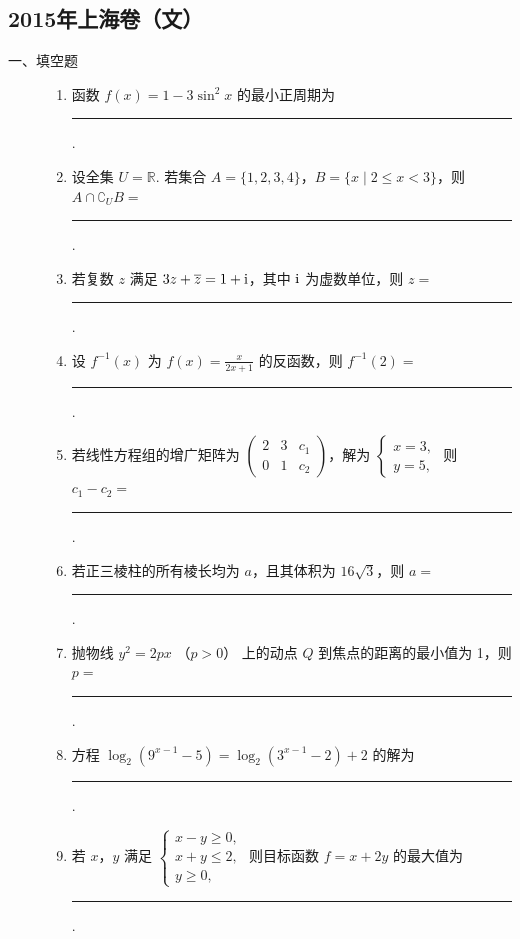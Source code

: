 \subsection{2015年上海卷（文）}\label{gk:2015年上海卷（文）}

\begin{description}

    \item[一、填空题]

    \begin{enumerate}[leftmargin=5pt]

        \item 函数 \( f(x)=1-3\sin^{2}x \) 的最小正周期为\rule[-0.3ex]{3em}{0.4pt}.

        \item 设全集 \(U = \mathbb{R}\). 若集合 \( A = \{1, 2, 3, 4\} \)，\( B = \{x \mid 2 \leqslant x < 3\} \)，则 \( A \cap \complement_U B = \)\rule[-0.3ex]{3em}{0.4pt}.

        \item 若复数 \(z\) 满足 \( 3z + \overline{z} = 1 + \mathrm{i} \)，其中 \(\mathrm{i}\) 为虚数单位，则 \(z =\)\rule[-0.3ex]{3em}{0.4pt}.

        \item 设 \( f^{-1}(x) \) 为 \( f(x)=\frac{x}{2x+1} \) 的反函数，则 \( f^{-1}(2)= \)\rule[-0.3ex]{3em}{0.4pt}.

        \item 若线性方程组的增广矩阵为 \( \begin{pmatrix} 2 & 3 & c_{1} \\ 0 & 1 & c_{2} \end{pmatrix} \)，解为 \( \begin{cases}
x = 3,\\
y = 5,
\end{cases} \) 则 \( c_{1}-c_{2}= \)\rule[-0.3ex]{3em}{0.4pt}.

        \item 若正三棱柱的所有棱长均为 \(a\)，且其体积为 \(16\sqrt{3}\)，则 \(a = \)\rule[-0.3ex]{3em}{0.4pt}.

        \item 抛物线 \( y^{2}=2px \) （\(p>0\)） 上的动点 \(Q\) 到焦点的距离的最小值为 1，则 \(p=\)\rule[-0.3ex]{3em}{0.4pt}.

        \item 方程 \( \log_{2}(9^{x-1}-5)=\log_{2}(3^{x-1}-2)+2 \) 的解为\rule[-0.3ex]{3em}{0.4pt}.

        \item 若 \(x\)，\(y\) 满足 \(\begin{cases}
x - y \geqslant 0,\\
x + y \leqslant 2,\\
y \geqslant 0,
\end{cases}\) 则目标函数 \(f = x + 2y\) 的最大值为\rule[-0.3ex]{3em}{0.4pt}.


\end{enumerate}
\end{description}
